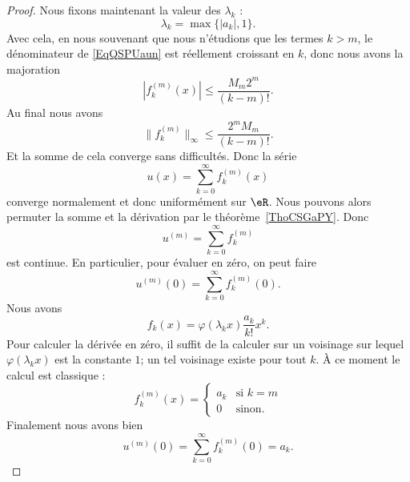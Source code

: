 \begin{proof}
    Nous fixons maintenant la valeur des \( \lambda_k\) :
    \begin{equation}
        \lambda_k=\max\{ | a_k |,1 \}.
    \end{equation}
    Avec cela, en nous souvenant que nous n'étudions que les termes \( k>m\), le dénominateur de \eqref{EqQSPUaun} est réellement croissant en \( k\), donc nous avons la majoration
    \begin{equation}
        | f^{(m)}_k(x) |\leq \frac{ M_m2^m }{ (k-m)! }.
    \end{equation}
    Au final nous avons
    \begin{equation}
        \| f_k^{(m)} \|_{\infty}\leq \frac{ 2^mM_m }{ (k-m)! }.
    \end{equation}
    Et la somme de cela converge sans difficultés. Donc la série
    \begin{equation}
        u(x)=\sum_{k=0}^{\infty}f_k^{(m)}(x)
    \end{equation}
    converge normalement et donc uniformément sur \( \eR\). Nous pouvons alors permuter la somme et la dérivation par le théorème~\ref{ThoCSGaPY}. Donc
    \begin{equation}
        u^{(m)}=\sum_{k=0}^{\infty}f_k^{(m)}
    \end{equation}
    est continue. En particulier, pour évaluer en zéro, on peut faire
    \begin{equation}
        u^{(m)}(0)=\sum_{k=0}^{\infty}f_k^{(m)}(0).
    \end{equation}
    Nous avons
    \begin{equation}
        f_k(x)=\varphi(\lambda_kx)\frac{ a_k }{ k! }x^k.
    \end{equation}
    Pour calculer la dérivée en zéro, il suffit de la calculer sur un voisinage sur lequel \( \varphi(\lambda_kx)\) est la constante \( 1\); un tel voisinage existe pour tout \( k\). À ce moment le calcul est classique :
    \begin{equation}
        f_k^{(m)}(x)=\begin{cases}
            a_k    &   \text{si } k=m\\
            0    &    \text{sinon}.
        \end{cases}
    \end{equation}
    Finalement nous avons bien
    \begin{equation}
        u^{(m)}(0)=\sum_{k=0}^{\infty}f_k^{(m)}(0)=a_k.
    \end{equation}

\end{proof}

